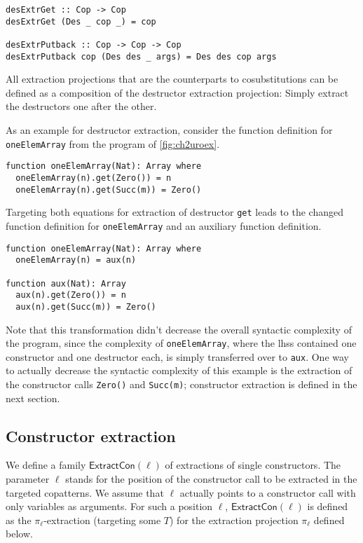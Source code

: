 \begin{lstlisting}
desExtrGet :: Cop -> Cop
desExtrGet (Des _ cop _) = cop

desExtrPutback :: Cop -> Cop -> Cop
desExtrPutback cop (Des des _ args) = Des des cop args
\end{lstlisting}

All extraction projections that are the counterparts to cosubstitutions can be defined as a composition of the destructor extraction projection: Simply extract the destructors one after the other.

As an example for destructor extraction, consider the function definition for \texttt{oneElemArray} from the program of \autoref{fig:ch2uroex}.
\begin{lstlisting}
function oneElemArray(Nat): Array where
  oneElemArray(n).get(Zero()) = n
  oneElemArray(n).get(Succ(m)) = Zero()
\end{lstlisting}
Targeting both equations for extraction of destructor \texttt{get} leads to the changed function definition for \texttt{oneElemArray} and an auxiliary function definition.
\begin{lstlisting}
function oneElemArray(Nat): Array where
  oneElemArray(n) = aux(n)

function aux(Nat): Array
  aux(n).get(Zero()) = n
  aux(n).get(Succ(m)) = Zero()
\end{lstlisting}
Note that this transformation didn't decrease the overall syntactic complexity of the program, since the complexity of \texttt{oneElemArray}, where the lhss contained one constructor and one destructor each, is simply transferred over to \texttt{aux}. One way to actually decrease the syntactic complexity of this example is the extraction of the constructor calls \texttt{Zero()} and \texttt{Succ(m)}; constructor extraction is defined in the next section.

\subsection{Constructor extraction}
\label{ssec:conextr}

We define a family $\textsf{ExtractCon}(\ell)$ of extractions of single constructors. The parameter $\ell$ stands for the position of the constructor call to be extracted in the targeted copatterns. We assume that $\ell$ actually points to a constructor call with only variables as arguments. For such a position $\ell$, $\textsf{ExtractCon}(\ell)$ is defined as the $\pi_\ell$-extraction (targeting some $T$) for the extraction projection $\pi_\ell$ defined below.

